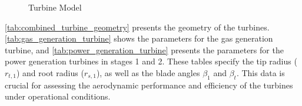 \documentclass{Format}
\begin{document}
\begin{figure}[H]
    \caption{Turbine Model}
    \label{fig:Turbine}
\end{figure}

\autoref{tab:combined_turbine_geometry} presents the geometry of the turbines. \autoref{tab:gas_generation_turbine} shows the parameters for the gas generation turbine, and \autoref{tab:power_generation_turbine} presents the parameters for the power generation turbines in stages 1 and 2. These tables specify the tip radius ($r_{t,1}$) and root radius ($r_{s,1}$), as well as the blade angles $\beta_1$ and $\beta_t$. This data is crucial for assessing the aerodynamic performance and efficiency of the turbines under operational conditions.
\end{document}
